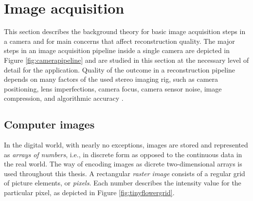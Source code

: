 


\section{Image acquisition} \label{sec:image-acquisition}




This section describes the background theory for basic image acquisition steps in a camera and for main concerns that affect reconstruction quality.
The major steps in an image acquisition pipeline inside a single camera are depicted in Figure \ref{fig:camerapipeline} and are studied in this section at the necessary level of detail for the application.
Quality of the outcome in a reconstruction pipeline depends on many factors of the used stereo imaging rig, such as camera positioning, lens imperfections, camera focus, camera sensor noise, image compression, and algorithmic accuracy \cite{hollsten2013imagequality,kyto2011method,rieke2009evaluation}.



\subsection{Computer images} \label{sec:computer-images}

In the digital world, with nearly no exceptions, images are stored and represented as \emph{arrays of numbers}, i.e., in discrete form as opposed to the continuous data in the real world.
The way of encoding images as dicrete two-dimensional arrays is used throughout this thesis.
A rectangular \emph{raster image} consists of a regular grid of picture elements, or \emph{pixels}.
Each number describes the intensity value for the particular pixel, as depicted in Figure \ref{fig:tinyflowergrid}.
\cite[ch. 2.2]{trucco1998introductory}

